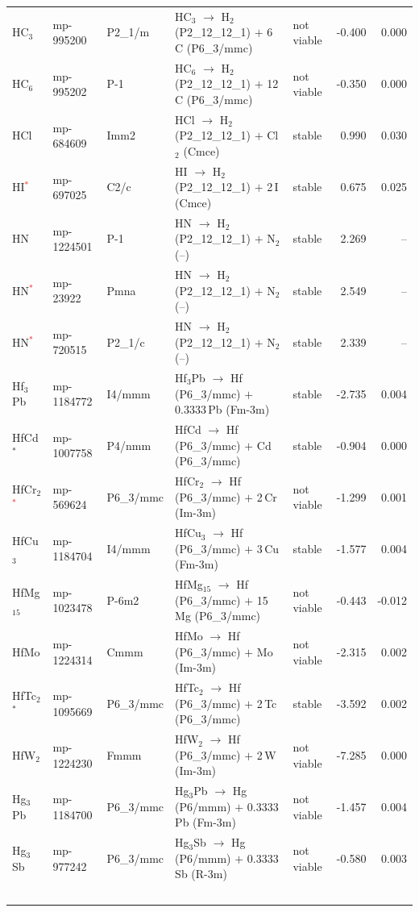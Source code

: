 \begin{longtable}{@{}ll l@{\hspace{4pt}} p{4.6cm} l@{\hspace{4pt}} rr@{}}
HC$_{3}$ & mp-995200 & P2\_1/m & HC$_{3}$ $\to$ H$_{2}$ (P2\_12\_12\_1) $+$ 6\,C (P6\_3/mmc) & not viable & -0.400 & 0.000 \\
HC$_{6}$ & mp-995202 & P-1 & HC$_{6}$ $\to$ H$_{2}$ (P2\_12\_12\_1) $+$ 12\,C (P6\_3/mmc) & not viable & -0.350 & 0.000 \\
HCl & mp-684609 & Imm2 & HCl $\to$ H$_{2}$ (P2\_12\_12\_1) $+$ Cl$_{2}$ (Cmce) & stable & 0.990 & 0.030 \\
HI\textcolor{red}{$^*$} & mp-697025 & C2/c & HI $\to$ H$_{2}$ (P2\_12\_12\_1) $+$ 2\,I (Cmce) & stable & 0.675 & 0.025 \\
HN & mp-1224501 & P-1 & HN $\to$ H$_{2}$ (P2\_12\_12\_1) $+$ N$_{2}$ (--) & stable & 2.269 & -- \\
HN\textcolor{red}{$^*$} & mp-23922 & Pmna & HN $\to$ H$_{2}$ (P2\_12\_12\_1) $+$ N$_{2}$ (--) & stable & 2.549 & -- \\
HN\textcolor{red}{$^*$} & mp-720515 & P2\_1/c & HN $\to$ H$_{2}$ (P2\_12\_12\_1) $+$ N$_{2}$ (--) & stable & 2.339 & -- \\
Hf$_{3}$Pb & mp-1184772 & I4/mmm & Hf$_{3}$Pb $\to$ Hf (P6\_3/mmc) $+$ 0.3333\,Pb (Fm-3m) & stable & -2.735 & 0.004 \\
HfCd$^*$ & mp-1007758 & P4/nmm & HfCd $\to$ Hf (P6\_3/mmc) $+$ Cd (P6\_3/mmc) & stable & -0.904 & 0.000 \\
HfCr$_{2}$\textcolor{red}{$^*$} & mp-569624 & P6\_3/mmc & HfCr$_{2}$ $\to$ Hf (P6\_3/mmc) $+$ 2\,Cr (Im-3m) & not viable & -1.299 & 0.001 \\
HfCu$_{3}$ & mp-1184704 & I4/mmm & HfCu$_{3}$ $\to$ Hf (P6\_3/mmc) $+$ 3\,Cu (Fm-3m) & stable & -1.577 & 0.004 \\
HfMg$_{15}$ & mp-1023478 & P-6m2 & HfMg$_{15}$ $\to$ Hf (P6\_3/mmc) $+$ 15\,Mg (P6\_3/mmc) & not viable & -0.443 & -0.012 \\
HfMo & mp-1224314 & Cmmm & HfMo $\to$ Hf (P6\_3/mmc) $+$ Mo (Im-3m) & not viable & -2.315 & 0.002 \\
HfTc$_{2}$$^*$ & mp-1095669 & P6\_3/mmc & HfTc$_{2}$ $\to$ Hf (P6\_3/mmc) $+$ 2\,Tc (P6\_3/mmc) & stable & -3.592 & 0.002 \\
HfW$_{2}$ & mp-1224230 & Fmmm & HfW$_{2}$ $\to$ Hf (P6\_3/mmc) $+$ 2\,W (Im-3m) & not viable & -7.285 & 0.000 \\
Hg$_{3}$Pb & mp-1184700 & P6\_3/mmc & Hg$_{3}$Pb $\to$ Hg (P6/mmm) $+$ 0.3333\,Pb (Fm-3m) & not viable & -1.457 & 0.004 \\
Hg$_{3}$Sb & mp-977242 & P6\_3/mmc & Hg$_{3}$Sb $\to$ Hg (P6/mmm) $+$ 0.3333\,Sb (R-3m) & not viable & -0.580 & 0.003 \\
$$
\end{longtable}
